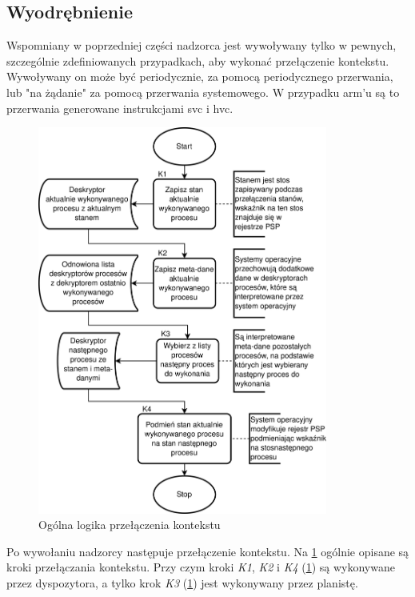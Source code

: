 \documentclass[../../main]{subfiles}
\begin{document}
\subsection{Wyodrębnienie}

Wspomniany w poprzedniej części nadzorca jest wywoływany tylko w pewnych, szczególnie zdefiniowanych przypadkach, aby wykonać przełączenie kontekstu. Wywoływany on może być periodycznie, za pomocą periodycznego przerwania, lub "na żądanie" za pomocą przerwania systemowego. W przypadku \gls{arm}'u są to przerwania generowane instrukcjami \gls{svc} i \gls{hvc}.

\begin{figure}[H]
    \centering
    \includegraphics[width=0.85\textwidth]{Images/context-switching-armv8-m.png}
    \caption{Ogólna logika przełączenia kontekstu}
    \label{fig:armv8-m-context-switch}
\end{figure}

Po wywołaniu nadzorcy następuje przełączenie kontekstu. Na \cref{fig:armv8-m-context-switch} ogólnie opisane są kroki przełączania kontekstu. Przy czym kroki \textit{K1}, \textit{K2} i \textit{K4} (\cref{fig:armv8-m-context-switch}) są wykonywane przez dyspozytora, a tylko krok \textit{K3} (\cref{fig:armv8-m-context-switch}) jest wykonywany przez planistę.
\end{document}
